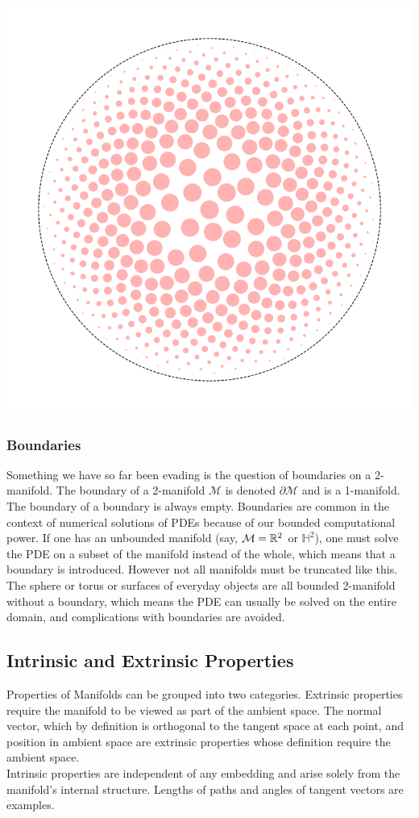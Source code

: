 {\begin{center}
        \includegraphics[width=0.8\columnwidth]{../images/hyperbolic_space_tissot.png}
    \end{center} 
}
\subsubsection*{Boundaries}
Something we have so far been evading is the question of boundaries on a 2-manifold. The boundary of a 2-manifold $\mathcal{M}$ is denoted $\partial \mathcal{M}$ and is a 1-manifold. The boundary of a boundary is always empty. Boundaries are common in the context of numerical solutions of PDEs because of our bounded computational power. If one has an unbounded manifold (say, $\mathcal{M} = \mathbb{R}^2$ or $\mathbb{H}^2$), one must solve the PDE on a subset of the manifold instead of the whole, which means that a boundary is introduced. However not all manifolds must be truncated like this. The sphere or torus or surfaces of everyday objects are all bounded 2-manifold without a boundary, which means the PDE can usually be solved on the entire domain, and complications with boundaries are avoided.

\subsection*{Intrinsic and Extrinsic Properties}
Properties of Manifolds can be grouped into two categories. Extrinsic properties require the manifold to be viewed as part of the ambient space. The normal vector, which by definition is orthogonal to the tangent space at each point, and position in ambient space are extrinsic properties whose definition require the ambient space. 
\\
Intrinsic properties are independent of any embedding and arise solely from the manifold's internal structure. Lengths of paths and angles of tangent vectors are examples.

